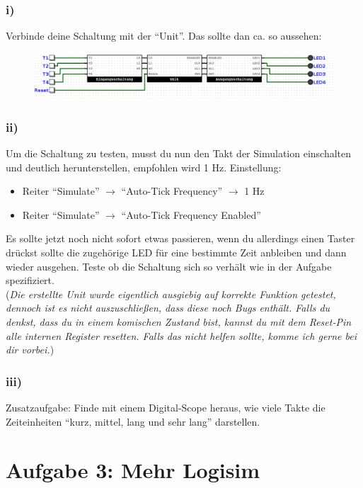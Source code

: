 \documentclass[a4paper]{scrartcl}
\begin{document}
\subsubsection*{i)}
Verbinde deine Schaltung mit der ``Unit''. Das sollte dan ca. so aussehen:

\begin{figure}[h]
	\includegraphics*[width=\textwidth]{integration.png}
\end{figure}

\subsubsection*{ii)}
Um die Schaltung zu testen, musst du nun den Takt der Simulation einschalten und deutlich herunterstellen, empfohlen wird 1 Hz.
Einstellung:
\begin{itemize}
	\item Reiter ``Simulate'' $\rightarrow$ ``Auto-Tick Frequency'' $\rightarrow$ 1 Hz
	\item Reiter ``Simulate'' $\rightarrow$ ``Auto-Tick Frequency Enabled''
\end{itemize} 

Es sollte jetzt noch nicht sofort etwas passieren, wenn du allerdings einen Taster drückst sollte die zugehörige LED für eine bestimmte 
Zeit anbleiben und dann wieder ausgehen. Teste ob die Schaltung sich so verhält wie in der Aufgabe spezifiziert. \\

(\textit{Die
erstellte Unit wurde eigentlich ausgiebig auf korrekte Funktion getestet, dennoch ist es nicht auszuschließen, dass diese noch Bugs enthält. Falls du denkst,
dass du in einem komischen Zustand bist, kannst du mit dem Reset-Pin alle internen Register resetten.
Falls das nicht helfen sollte, komme ich gerne bei dir vorbei.})\\

\subsubsection*{iii)}
Zusatzaufgabe: Finde mit einem Digital-Scope heraus, wie viele Takte die Zeiteinheiten ``kurz, mittel, lang und sehr lang'' darstellen.


\section*{Aufgabe 3: Mehr Logisim}
\end{document}
